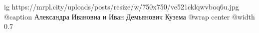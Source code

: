  
 
 
 
 

\ifcmt
  ig https://mrpl.city/uploads/posts/resize/w/750x750/ve521cklqwvboq6u.jpg
	@caption Александра Ивановна и Иван Демьянович Кузема
  @wrap center
  @width 0.7
\fi
